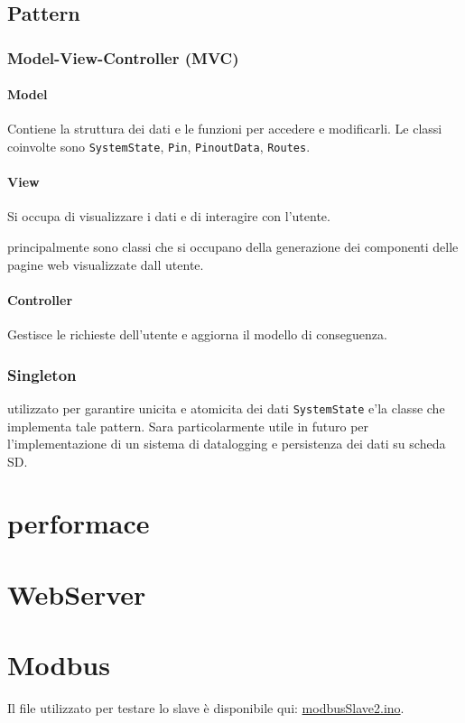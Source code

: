 \documentclass[12pt,a4paper]{report}
\begin{document}
\subsection{Pattern}
\subsubsection{Model-View-Controller (MVC)}
\paragraph{Model} Contiene la struttura dei dati e le funzioni per accedere e modificarli. 
Le classi coinvolte sono \texttt{SystemState}, \texttt{Pin}, \texttt{PinoutData}, \texttt{Routes}.
\paragraph{View} Si occupa di visualizzare i dati e di interagire con l'utente.

principalmente sono classi che si occupano della generazione dei componenti delle pagine web visualizzate dall utente.

\paragraph{Controller} Gestisce le richieste dell'utente e aggiorna il modello di conseguenza.

\subsubsection{Singleton}
utilizzato per garantire unicita e atomicita dei dati \texttt{SystemState} e'la classe che implementa tale pattern.
Sara particolarmente utile in futuro per l'implementazione di un sistema di datalogging e persistenza dei dati su scheda SD.
\section{performace}
\section{WebServer}
\section{Modbus}
Il file utilizzato per testare lo slave è disponibile qui: \href{src/SLAVE\_EXAMPLE/modbusSlave2/modbusSlave2.ino}{modbusSlave2.ino}.
\end{document}
